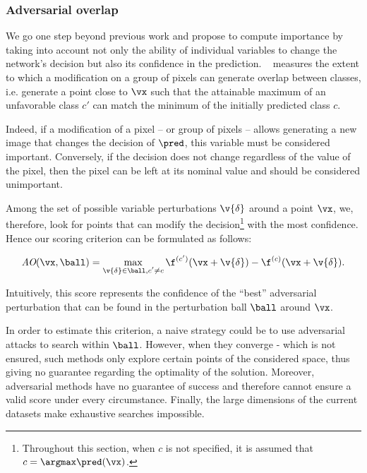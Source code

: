 \subsubsection{Adversarial overlap}



We go one step beyond previous work and propose to compute importance by taking into account not only the ability of individual variables to change the network's decision but also its confidence in the prediction.
\Adv ~ measures the extent to which a modification on a group of pixels can generate overlap between classes, i.e. generate a point close to $\vx$ such that the attainable maximum of an unfavorable class $c'$ can match the minimum of the initially predicted class $c$.

Indeed, if a modification of a pixel -- or group of pixels -- allows generating a new image that changes the decision of $\pred$, this variable must be considered important. 
Conversely, if the decision does not change regardless of the value of the pixel, then the pixel can be left at its nominal value and should be considered unimportant. 

Among the set of possible variable perturbations $\v{\delta}$ around a point $\vx$, we, therefore, look for points that can modify the decision\footnote{Throughout this section, when $c$ is not specified, it is assumed that $c = \argmax \pred(\vx)$.} with the most confidence.
Hence our scoring criterion can be formulated as follows:

\begin{equation}\label{eq:eva:adv_surface}
    \AO(\vx, \ball) = 
    \max_{\substack{\v{\delta} \in \ball, c'\neq c}} \f^{(c')}(\vx + \v{\delta}) - \f^{(c)}(\vx + \v{\delta}).
\end{equation}

Intuitively, this score represents the confidence of the ``best'' adversarial perturbation that can be found in the perturbation ball $\ball$ around $\vx$.

In order to estimate this criterion, a naive strategy could be to use adversarial attacks to search within $\ball$. 
However, when they converge - which is not ensured, such methods only explore certain points of the considered space, thus giving no guarantee regarding the optimality of the solution. 
Moreover, adversarial methods have no guarantee of success and therefore cannot ensure a valid score under every circumstance.
Finally, the large dimensions of the current datasets make exhaustive searches impossible.



